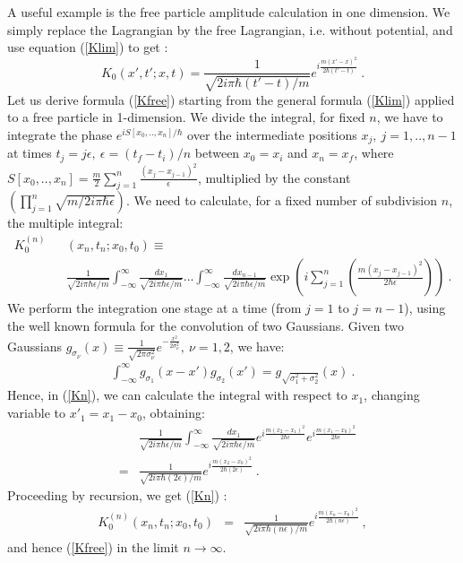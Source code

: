 \documentclass[12pt,aps,prb,preprint]{revtex4-1}   %
\begin{document}
A useful example is the free particle amplitude calculation in
one dimension. We simply replace the Lagrangian by the free
Lagrangian, i.e. without potential, and use equation
(\ref{Klim}) to get :
\begin{equation}\label{Kfree}
K_0(x',t';x,t)=\frac{1}{\sqrt{2i\pi \hbar(t'-t)/m}}
e^{i\frac{m(x'-x)^2}{2\hbar (t'-t)}}\ .
\end{equation}
Let us derive formula (\ref{Kfree}) starting from the general formula (\ref{Klim})
applied to a free particle in 1-dimension.
We divide the integral, for fixed $n$, we have to integrate the phase $e^{i S[x_0,..,x_n]/\hbar}$
over the intermediate positions $x_j,\ j=1,..,n-1$ at times $t_j=j\epsilon,\ \epsilon=(t_f-t_i)/n$ 
between $x_0=x_i$ and $x_n=x_f$, where $S[x_0,..,x_n]=\frac{m}{2}\sum_{j=1}^n\frac{(x_j-x_{j-1})^2}{\epsilon}$,
multiplied by the constant $\left(\prod_{j=1}^{n}\sqrt{m/2i\pi\hbar\epsilon}\right)$. 
We need to calculate, for a fixed number of subdivision $n$,
the multiple integral:
\begin{eqnarray}\label{Kn}
K_0^{(n)}&&(x_n,t_n;x_0,t_0)\equiv
{}\nonumber{}\\{}&&\frac{1}{\sqrt{2i\pi \hbar\epsilon/m}}\int_{-\infty}^{\infty}
\frac{dx_1}{\sqrt{2i\pi \hbar\epsilon/m}}
\ldots\int_{-\infty}^{\infty}\frac{dx_{n-1}}{\sqrt{2i\pi \hbar\epsilon/m}}
\exp{\left(i\sum_{j=1}^{n}(\frac{m(x_{j}-x_{j-1})^2}{2\hbar\epsilon})
\right)}\ .
\end{eqnarray}
We perform the integration one stage at a time (from $j=1$ to $j=n-1$),
using the well known formula for the convolution of two Gaussians.
Given two Gaussians $g_{\sigma_\nu}(x)\equiv\frac{1}{\sqrt{2\pi\sigma_\nu^2}}
e^{-\frac{x^2}{2\sigma_\nu^2}},\ \nu=1,2$, we have:
\begin{eqnarray}\label{GaussianConvo}
\int_{-\infty}^{\infty}g_{\sigma_1}(x-x')g_{\sigma_2}(x')=g_{\sqrt{\sigma_1^2+\sigma_2^2}}(x)\ . 
\end{eqnarray}
Hence, in (\ref{Kn}), we can calculate the integral with respect to $x_1$,
changing variable to $x'_1=x_1-x_0$, obtaining:
\begin{eqnarray*}
&&\frac{1}{\sqrt{2i\pi \hbar\epsilon/m}}\int_{-\infty}^{\infty}\frac{dx_1}{\sqrt{2i\pi \hbar\epsilon/m}}
e^{i\frac{m(x_{2}-x_{1})^2}{2\hbar\epsilon}}e^{i\frac{m(x_{1}-x_0)^2}{2\hbar\epsilon}}
{}\\{}&=&\frac{1}{\sqrt{2i\pi \hbar(2\epsilon)/m}}e^{i\frac{m(x_{2}-x_0)^2}{2\hbar(2\epsilon)}}\ .
\end{eqnarray*}
Proceeding by recursion, we get (\ref{Kn}) :
\begin{eqnarray*}
K_0^{(n)}(x_n,t_n;x_0,t_0)&=&\frac{1}{\sqrt{2i\pi \hbar(n\epsilon)/m}}e^{i\frac{m(x_{n}-x_0)^2}{2\hbar(n\epsilon)}}\ ,
\end{eqnarray*}
and hence (\ref{Kfree}) in the limit $n\rightarrow\infty$.
\end{document}
